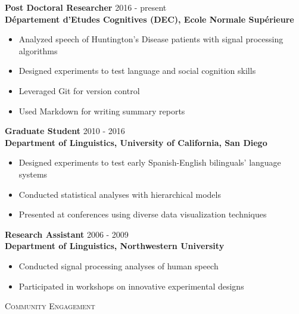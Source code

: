\documentclass[9pt]{article}
\newenvironment{changemargin}[2]{%
  \begin{list}{}{%
    \setlength{\topsep}{0pt}%
    \setlength{\leftmargin}{#1}%
    \setlength{\rightmargin}{#2}%
    \setlength{\listparindent}{\parindent}%
    \setlength{\itemindent}{\parindent}%
    \setlength{\parsep}{\parskip}%
  }%
  \item[]}{\end{list}
}
\newcommand{\lineover}{
	\begin{changemargin}{-0.05in}{-0.05in}
		\vspace*{-8pt}
		\hrulefill \\
		\vspace*{-2pt}
	\end{changemargin}
}
\newcommand{\header}[1]{
	\begin{changemargin}{-0.5in}{-0.5in}
		\scshape{#1}\\
  	\lineover
	\end{changemargin}
}
\newenvironment{body} {
	\vspace*{-16pt}
	\begin{changemargin}{-0.25in}{-0.5in}
  }	
	{\end{changemargin}
}
\begin{document}
\begin{body}
	\vspace{14pt}
	
	\textbf{Post Doctoral Researcher} \hfill 2016 - present\\
	\textbf{D\'epartement d'Etudes Cognitives (DEC), Ecole Normale Sup\'erieure}\\
	\begin{itemize}
		\item Analyzed speech of Huntington's Disease patients with signal processing algorithms
		\item Designed experiments to test language and social cognition skills
		\item Leveraged Git for version control
		\item Used Markdown for writing summary reports
	\end{itemize}
	\medskip
	\medskip
	
	\textbf{Graduate Student} \hfill 2010 - 2016\\
	\textbf{Department of Linguistics, University of California, San Diego}\\
	\begin{itemize}
		\item Designed experiments to test early Spanish-English bilinguals' language systems
		\item Conducted statistical analyses with hierarchical models
		\item Presented at conferences using diverse data visualization techniques
	\end{itemize}
	\medskip
	\medskip

	\textbf{Research Assistant} \hfill 2006 - 2009\\
	\textbf{Department of Linguistics, Northwestern University}\\
	\begin{itemize}
		\item Conducted signal processing analyses of human speech
		\item Participated in workshops on innovative experimental designs
	\end{itemize}
	\medskip
	\medskip
	
\end{body}

\smallskip


\header{\color{red}Community Engagement}
\end{document}
